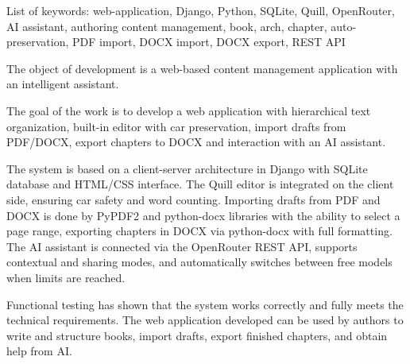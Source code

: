 List of keywords: web-application, Django, Python, SQLite, Quill, OpenRouter, AI assistant, authoring content management, book, arch, chapter, auto-preservation, PDF import, DOCX import, DOCX export, REST API

The object of development is a web-based content management application with an intelligent assistant.

The goal of the work is to develop a web application with hierarchical text organization, built-in editor with car preservation, import drafts from PDF/DOCX, export chapters to DOCX and interaction with an AI assistant.

The system is based on a client-server architecture in Django with SQLite database and HTML/CSS interface. The Quill editor is integrated on the client side, ensuring car safety and word counting. Importing drafts from PDF and DOCX is done by PyPDF2 and python-docx libraries with the ability to select a page range, exporting chapters in DOCX via python-docx with full formatting. The AI assistant is connected via the OpenRouter REST API, supports contextual and sharing modes, and automatically switches between free models when limits are reached.

Functional testing has shown that the system works correctly and fully meets the technical requirements. The web application developed can be used by authors to write and structure books, import drafts, export finished chapters, and obtain help from AI.
